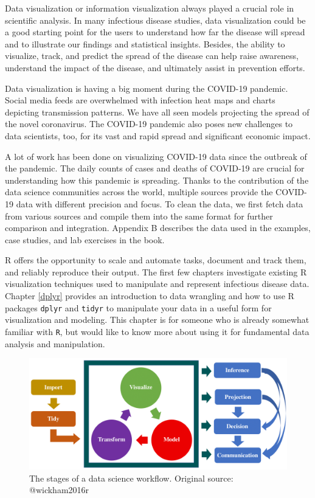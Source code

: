 \documentclass[]{book}
\begin{document}
Data visualization or information visualization always played a crucial
role in scientific analysis. In many infectious disease studies, data
visualization could be a good starting point for the users to understand
how far the disease will spread and to illustrate our findings and
statistical insights. Besides, the ability to visualize, track, and
predict the spread of the disease can help raise awareness, understand
the impact of the disease, and ultimately assist in prevention efforts.

Data visualization is having a big moment during the COVID-19 pandemic.
Social media feeds are overwhelmed with infection heat maps and charts
depicting transmission patterns. We have all seen models projecting the
spread of the novel coronavirus. The COVID-19 pandemic also poses new
challenges to data scientists, too, for its vast and rapid spread and
significant economic impact.

A lot of work has been done on visualizing COVID-19 data since the
outbreak of the pandemic. The daily counts of cases and deaths of
COVID-19 are crucial for understanding how this pandemic is spreading.
Thanks to the contribution of the data science communities across the
world, multiple sources provide the COVID-19 data with different
precision and focus. To clean the data, we first fetch data from various
sources and compile them into the same format for further comparison and
integration. Appendix B describes the data used in the examples, case
studies, and lab exercises in the book.

R offers the opportunity to scale and automate tasks, document and track
them, and reliably reproduce their output. The first few chapters
investigate existing R visualization techniques used to manipulate and
represent infectious disease data. Chapter \ref{dplyr} provides an
introduction to data wrangling and how to use R packages \texttt{dplyr}
and \texttt{tidyr} to manipulate your data in a useful form for
visualization and modeling. This chapter is for someone who is already
somewhat familiar with \texttt{R}, but would like to know more about
using it for fundamental data analysis and manipulation.

\begin{figure}

{\centering \includegraphics[width=0.7\linewidth]{figures/process} 

}

\caption{The stages of a data science workflow. Original source: @wickham2016r}\label{fig:process}
\end{figure}
\end{document}
